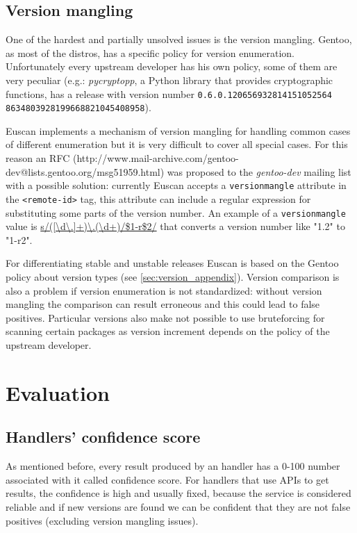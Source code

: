 \subsection{Version mangling}
One of the hardest and partially unsolved issues is the version mangling. Gentoo, as most of the distros, has a specific policy for version enumeration. Unfortunately every upstream developer has his own policy, some of them are very peculiar (e.g.: \emph{pycryptopp}, a Python library that provides cryptographic functions, has a release with version number \texttt{0.6.0.120656932814151052564 
8634803928199668821045408958}).

Euscan implements a mechanism of version mangling for handling common cases of different enumeration but it is very difficult to cover all special cases. For this reason an RFC (http://www.mail-archive.com/gentoo-dev@lists.gentoo.org/msg51959.html) was proposed to the \emph{gentoo-dev} mailing list with a possible solution: currently Euscan accepts a \texttt{versionmangle} attribute in the \texttt{<remote-id>} tag, this attribute can include a regular expression for substituting some parts of the version number. An example of a \texttt{versionmangle} value is \url{s/([\d\.]+)\.(\d+)/\$1-r\$2/} that converts a version number like "1.2" to "1-r2".

For differentiating stable and unstable releases Euscan is based on the Gentoo policy about version types (see \ref{sec:version_appendix}).
Version comparison is also a problem if version enumeration is not standardized: without version mangling the comparison can result erroneous and this could lead to false positives.
Particular versions also make not possible to use bruteforcing for scanning certain packages as version increment depends on the policy of the upstream developer.

\section{Evaluation}
\subsection{Handlers' confidence score}
As mentioned before, every result produced by an handler has a 0-100 number associated with it called confidence score. For handlers that use APIs to get results, the confidence is high and usually fixed, because the service is considered reliable and if new versions are found we can be confident that they are not false positives (excluding version mangling issues).


